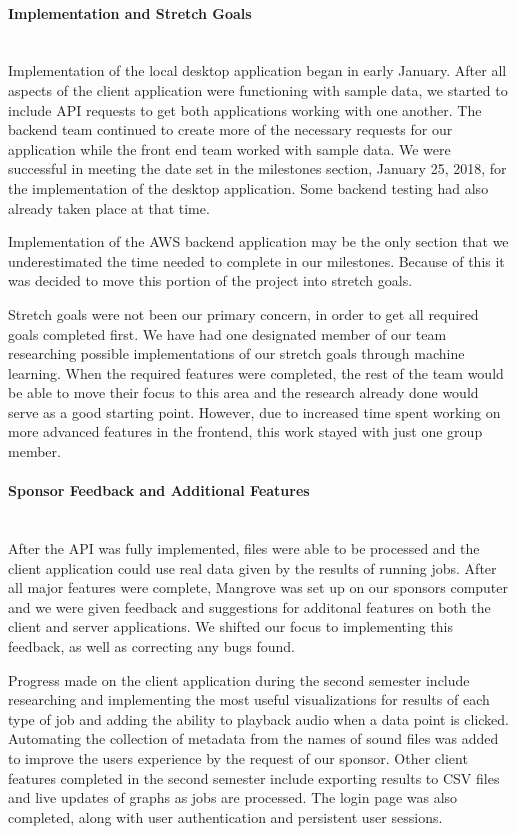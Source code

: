 \paragraph{Implementation and Stretch Goals} \mbox{}\\[\paragraphheaderspace]
Implementation of the local desktop application began in early January. After all aspects of the client application were functioning with sample data, we started to include API requests to get both applications working with one another. The backend team continued to create more of the necessary requests for our application while the front end team worked with sample data. We were successful in meeting the date set in the milestones section, January 25, 2018, for the implementation of the desktop application. Some backend testing had also already taken place at that time.\par
Implementation of the AWS backend application may be the only section that we underestimated the time needed to complete in our milestones. Because of this it was decided to move this portion of the project into stretch goals.\par
Stretch goals were not been our primary concern, in order to get all required goals completed first. We have had one designated member of our team researching possible implementations of our stretch goals through machine learning. When the required features were completed, the rest of the team would be able to move their focus to this area and the research already done would serve as a good starting point. However, due to increased time spent working on more advanced features in the frontend, this work stayed with just one group member.\par

\paragraph{Sponsor Feedback and Additional Features} \mbox{}\\[\paragraphheaderspace]
After the API was fully implemented, files were able to be processed and the client application could use real data given by the results of running jobs. After all major features were complete, Mangrove was set up on our sponsor\textquotesingle s computer and we were given feedback and suggestions for additonal features on both the client and server applications. We shifted our focus to implementing this feedback, as well as correcting any bugs found.\par
Progress made on the client application during the second semester include researching and implementing the most useful visualizations for results of each type of job and adding the ability to playback audio when a data point is clicked. Automating the collection of metadata from the names of sound files was added to improve the user\textquotesingle s experience by the request of our sponsor. Other client features completed in the second semester include exporting results to CSV files and live updates of graphs as jobs are processed. The login page was also completed, along with user authentication and persistent user sessions.\par
